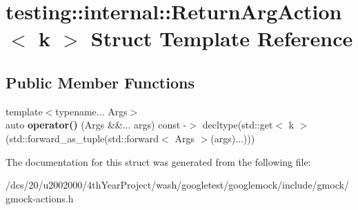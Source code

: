 \hypertarget{structtesting_1_1internal_1_1ReturnArgAction}{}\section{testing\+:\+:internal\+:\+:Return\+Arg\+Action$<$ k $>$ Struct Template Reference}
\label{structtesting_1_1internal_1_1ReturnArgAction}
\subsection*{Public Member Functions}
\begin{DoxyCompactItemize}
\item 
\mbox{\label{structtesting_1_1internal_1_1ReturnArgAction_a9dfff01e75ea87c66c54e02ee4ea680a}} 
{\footnotesize template$<$typename... Args$>$ }\\auto {\bfseries operator()} (Args \&\&... args) const -\/$>$ decltype(std\+::get$<$ k $>$(std\+::forward\+\_\+as\+\_\+tuple(std\+::forward$<$ Args $>$(args)...)))
\end{DoxyCompactItemize}


The documentation for this struct was generated from the following file\+:\begin{DoxyCompactItemize}
\item 
/dcs/20/u2002000/4th\+Year\+Project/wash/googletest/googlemock/include/gmock/gmock-\/actions.\+h\end{DoxyCompactItemize}
